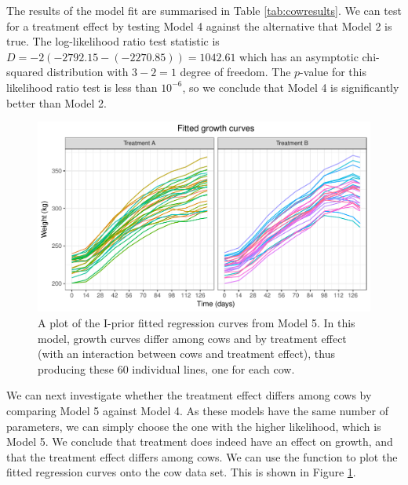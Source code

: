 \documentclass[a4paper,showframe,11pt]{report}\usepackage[]{graphicx}\usepackage[]{color}
\newenvironment{knitrout}{}{} %
\begin{document}
The results of the model fit are summarised in Table \ref{tab:cowresults}. We can test for a treatment effect by testing Model 4 against the alternative that Model 2 is true. The log-likelihood ratio test statistic is $D = -2(-2792.15 - (-2270.85)) = 1042.61$ which has an asymptotic chi-squared distribution with $3 - 2 = 1$ degree of freedom. The $p$-value for this likelihood ratio test is less than $10^{-6}$, so we conclude that Model 4 is significantly better than Model 2.

\begin{knitrout}
\color{fgcolor}\begin{figure}[h]

{\centering \includegraphics[width=\linewidth]{figure/cow_plot-1} 

}

\caption[A plot of the I-prior fitted regression curves from Model 5]{A plot of the I-prior fitted regression curves from Model 5. In this model, growth curves differ among cows and by treatment effect (with an interaction between cows and treatment effect), thus producing these 60 individual lines, one for each cow.}\label{fig:cow_plot}
\end{figure}


\end{knitrout}

We can next investigate whether the treatment effect differs among cows by comparing Model 5 against Model 4. As these models have the same number of parameters, we can simply choose the one with the higher likelihood, which is Model 5. We conclude that treatment does indeed have an effect on growth, and that the treatment effect differs among cows. We can use the  function to plot the fitted regression curves onto the cow data set. This is shown in Figure \ref{fig:cow_plot}.
\end{document}
